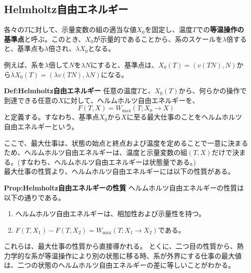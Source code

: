 \documentclass[a4paper,11pt]{jsarticle}
\numberwithin{equation}{section}
\begin{document}
\subsection{Helmholtz自由エネルギー}
    各々の$T$に対して、示量変数の組の適当な値$X_0$を固定し、温度$T$での\textbf{等温操作の基準点}と呼ぶ。このとき、$X_0$が示量的であることから、系のスケールを$\lambda$倍すると、基準点も$\lambda$倍され、$\lambda X_0$となる。

例えば、系を$\lambda$倍して$N$を$\lambda N$にすると、基準点は、$X_0(T) =(v(TN),N)$から$\lambda X_0(T) = (\lambda v(TN),\lambda N)$になる。\\

\begin{itembox}[l]{\textbf{Def:Helmholtz自由エネルギー}}
    任意の温度$T$と、$X_0(T)$から、何らかの操作で到達できる任意の$X$に対して、ヘルムホルツ自由エネルギーを、
    \begin{equation}
        F(T,X) = W_{\text{max}}(T;X_0\rightarrow X)
    \end{equation}
    と定義する。すなわち、基準点$X_0$から$X$に至る最大仕事のことをヘルムホルツ自由エネルギーという。
\end{itembox}
ここで、最大仕事は、状態の始点と終点および温度を定めることで一意に決まるため、ヘルムホルツ自由エネルギーは、温度と示量変数の組$(T,X)$だけで決まる。(すなわち、ヘルムホルツ自由エネルギーは状態量である。)\\

最大仕事の性質より、ヘルムホルツ自由エネルギーには以下の性質がある。\\
\begin{itembox}[l]{\textbf{Prop:Helmholtz自由エネルギーの性質}}
    ヘルムホルツ自由エネルギーの性質は以下の通りである。
    \begin{enumerate}
        \item ヘルムホルツ自由エネルギーは、相加性および示量性を持つ。
        \item $F(T,X_1)-F(T,X_2)=W_{\text{max}}(T;X_1\rightarrow X_2)$である。
    \end{enumerate}
\end{itembox}
これらは、最大仕事の性質から直接導かれる。
とくに、二つ目の性質から、熱力学的な系が等温操作により別の状態に移る時、系が外界にする仕事の最大値は、二つの状態のヘルムホルツ自由エネルギーの差に等しいことがわかる。\\
\end{document}
